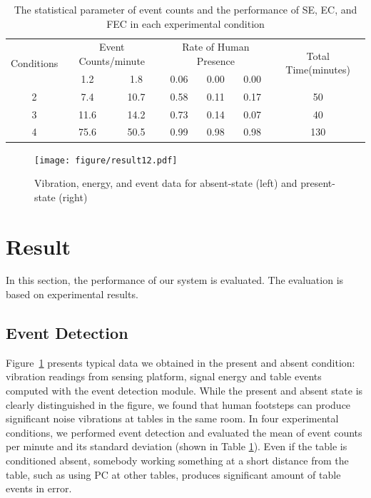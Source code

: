 \documentclass{sig-alternate-ipsn13}
\begin{document}


\begin{table}[h]
  \centering 
  \caption{The statistical parameter of event counts and the performance of SE, EC, and FEC in each experimental condition}
  \begin{tabular}{|c|c|c|c|c|c|c|}
    \hline
    \multirow{4}{*}{Conditions} &
      \multicolumn{2}{c|}{\multirow{3}{*}{Event Counts/minute}} &
      \multicolumn{3}{c|}{\multirow{3}{*}{Rate of Human Presence}} & 
      \multirow{4}{*}{Total Time(minutes)} \\
      &\multicolumn{2}{c|}{}&\multicolumn{3}{c|}{}&\\
      \cline{2-6}
        & Mean & SD & SE & EC & FEC & \\ 
      \hline
      1 & 1.2 & 1.8 & 0.06 & 0.00 & 0.00 & 20\\
      \hline
      2 & 7.4 & 10.7 & 0.58 & 0.11 & 0.17 & 50\\
      \hline
      3 & 11.6 & 14.2 & 0.73 & 0.14 & 0.07 & 40\\
      \hline
      4 & 75.6 & 50.5 & 0.99 & 0.98 & 0.98 & 130\\
      \hline
  \end{tabular}
  \label{tab:table2}  
\end{table}


\begin{figure}[h]
  \centering
  \texttt{[image: figure/result12.pdf]}
  \caption{Vibration, energy, and event data for absent-state (left) and present-state (right)}
  \label{fig:Result12}
\end{figure}


\section{Result}

In this section, the performance of our system is evaluated. The evaluation is based on experimental results.

\subsection{Event Detection}
Figure~\ref{fig:Result12} presents typical data we obtained in the present and absent condition: vibration readings from sensing platform, signal energy and table events computed with the event detection module. While the present and absent state is clearly distinguished in the figure, we found that human footsteps can produce significant noise vibrations at tables in the same room. In four experimental conditions, we performed event detection and evaluated the mean of event counts per minute and its standard deviation (shown in Table \ref{tab:table2}). Even if the table is conditioned absent, somebody working something at a short distance from the table, such as using PC at other tables, produces significant amount of table events in error.
\end{document}
